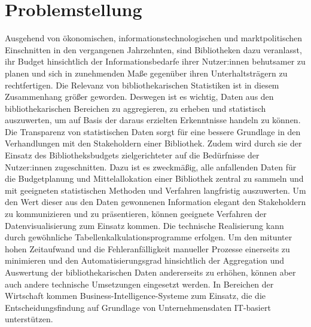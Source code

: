 \section{Problemstellung}
Ausgehend von ökonomischen, informationstechnologischen und marktpolitischen Einschnitten in den
vergangenen Jahrzehnten, sind Bibliotheken dazu veranlasst, ihr Budget hinsichtlich der Informationsbedarfe
ihrer Nutzer:innen behutsamer zu planen und sich in zunehmenden Maße gegenüber ihren Unterhaltsträgern zu rechtfertigen.
Die Relevanz von bibliothekarischen Statistiken ist in diesem Zusammenhang größer geworden.
Deswegen ist es wichtig, Daten aus den bibliothekarischen Bereichen zu aggregieren, zu erheben und statistisch
auszuwerten, um auf Basis der daraus erzielten Erkenntnisse handeln zu können. 
Die Transparenz von statistischen Daten sorgt für eine bessere Grundlage in den Verhandlungen mit den Stakeholdern
einer Bibliothek. Zudem wird durch sie der Einsatz des Bibliotheksbudgets zielgerichteter auf die Bedürfnisse der Nutzer:innen zugeschnitten.
Dazu ist es zweckmäßig, alle anfallenden Daten für die Budgetplanung und Mittelallokation einer Bibliothek zentral zu sammeln und mit geeigneten 
statistischen Methoden und Verfahren langfristig auszuwerten. Um den Wert dieser aus den Daten gewonnenen Information elegant den Stakeholdern zu kommunizieren und zu präsentieren,
können geeignete Verfahren der Datenvisualisierung zum Einsatz kommen. Die technische Realisierung kann durch gewöhnliche Tabellenkalkulationsprogramme erfolgen.
Um den mitunter hohen Zeitaufwand und die Fehleranfälligkeit manueller Prozesse einerseits zu minimieren und den Automatisierungsgrad hinsichtlich der Aggregation und Auswertung der bibliothekarischen Daten 
andererseits zu erhöhen, können aber auch andere technische Umsetzungen eingesetzt werden. In Bereichen der Wirtschaft kommen Business-Intelligence-Systeme zum Einsatz,
die die Entscheidungsfindung auf Grundlage von Unternehmensdaten IT-basiert unterstützen.

